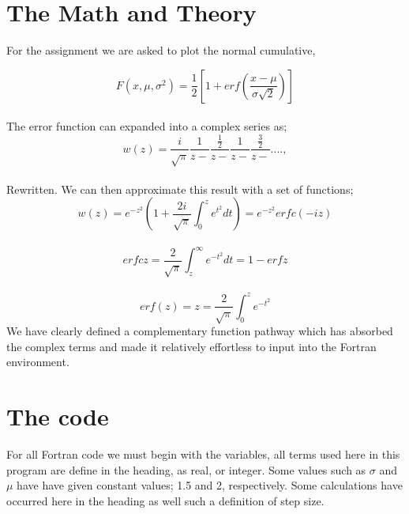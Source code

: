 \documentclass[12pt,letterpaper,notitlepage]{article}
\begin{document}
\section{The Math and Theory}

For the assignment we are asked to plot the normal cumulative,

	\begin{equation}
	{F(x, \mu, \sigma^2) =\frac{1}{2}} \left[1+ erf \left( \frac{x -\mu}{\sigma\sqrt{2}} \right) \right]	
	\end{equation}
\\
The error function can expanded into a complex series as; 
\\
	\begin{equation}
	w(z) = \frac{i}{\sqrt{\pi}}\frac{1}{z-}\frac{\frac{1}{2}}{z-}\frac{1}{z-}\frac{\frac{3}{2}}{z-}....,
	\end{equation}	
\\
Rewritten. We can then approximate this result with a set of functions; 
\\
	\begin{equation}
		w(z)=e^{-z^{2}}\left(1+\frac{2i}{\sqrt{\pi}}\int_{0}^{z}e^{t^{2}}dt\right)=e^{-z^{2}}{erfc}(-iz)
	\end{equation}
\\
	\begin{equation}
	erfc z={\frac{2}{\sqrt{\pi}}\int_{z}^{\infty}e^{-t^{2}}dt=1-erf} z	
	\end{equation}
\\
	\begin{equation}
	erf(z) = z=\frac{2}{\sqrt{\pi}}\int_{0}^{z}e^{-t^{2}}
	\end{equation}
We have clearly defined a complementary function pathway which has absorbed the complex terms and made it relatively effortless to input into the Fortran environment.  

\section{The code}

For all Fortran code we must begin with the variables, all terms used here in this program are define in the heading, as real, or integer. Some values such as $\sigma$ and $\mu$ have have given constant values; 1.5 and 2, respectively. Some calculations have occurred here in the heading as well such a definition of step size.  
\end{document}
